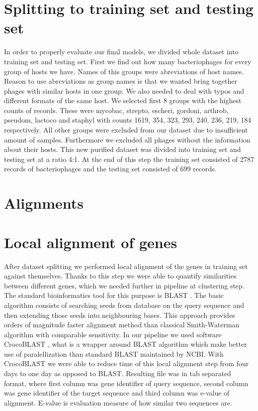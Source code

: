 \section{Splitting to training set and testing set}
In order to properly evaluate our final models, we divided whole dataset into training set and testing set.
First we find out how many bacteriophages for every group of hosts we have. 
Names of this groups were abreviations of host names.
Reason to use abreviations as group names is that we wanted bring together phages with similar hosts in one group.
We also needed to deal with typos and different formats of the same host.
We selected first 8 groups with the highest counts of records.
These were mycobac, strepto, escheri, gordoni, arthrob, pseudom, lactoco and staphyl with counts 1619, 354, 323, 293, 240, 236, 219, 184 respectively.
All other groups were excluded from our dataset due to insufficient amount of samples.
Furthermore we excluded all phages without the information about their hosts.
This new purified dataset was divided into training set and testing set at a ratio 4:1.
At the end of this step the training set consisted of 2787 records of bacteriophages and the testing set consisted of 699 records.

\section{Alignments}
\section{Local alignment of genes}
After dataset splitting we performed local alignment of the genes in training set against themselves.
Thanks to this step we were able to quantify similarities between different genes, which we needed further in pipeline at clustering step.
The standard bioinformatics tool for this purpose is BLAST \cite{blast}. 
The basic algorithm consists of searching seeds from database on the query sequence and then extending those seeds into neighbouring bases.
This approach provides orders of magnitude faster alignment method than classical Smith-Waterman algorithm \cite{smith_waterman} with comparable sensitivity.
In our pipeline we used software CrocoBLAST \cite{crocoblast}, what is a wrapper around BLAST algorithm which make better use of paralellization than standard BLAST maintained by NCBI.
With CrocoBLAST we were able to reduce time of this local alignment step from four days to one day as opposed to BLAST.
Resulting file was in tab separated format, where first column was gene identifier of query sequence, second column was gene identifier of the target sequence and third column was e-value of alignment. 
E-value is evaluation measure of how similar two sequences are.

